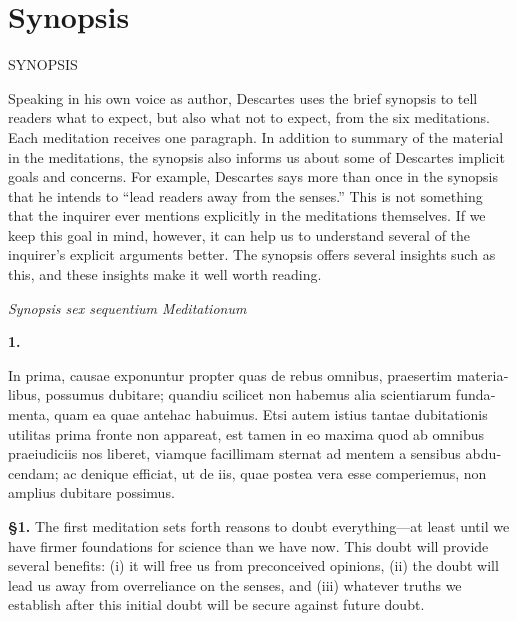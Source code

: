 \chapter{Synopsis}
%
    {\MakeUppercase{Synopsis}}


Speaking in his own voice as author, Descartes uses the brief synopsis to tell readers what to expect, but also what not to expect, from the six meditations. Each meditation receives one paragraph. In addition to summary of the material in the meditations, the synopsis also informs us about some of Descartes implicit goals and concerns. For example, Descartes says more than once in the synopsis that he intends to ``lead readers away from the senses.'' This is not something that the inquirer ever mentions explicitly in the meditations themselves. If we keep this goal in mind, however, it can help us to understand several of the inquirer's explicit arguments better. The synopsis offers several insights such as this, and these insights make it well worth reading.
\clearpage

\begin{center}
    \beginnumbering
    \numberlinefalse
    \pstart
    \textit{Synopsis sex sequentium Meditationum}
    \pend
    \endnumbering
\end{center}

\beginnumbering
\pstart
\textbf{1.} \begin{latin}In prima, causae exponuntur propter quas de rebus omnibus, praesertim materialibus, possumus dubitare; quandiu scilicet non habemus alia scientiarum fundamenta, quam ea quae antehac habuimus. Etsi autem istius tantae dubitationis utilitas prima fronte non appareat, est tamen in eo maxima quod ab omnibus praeiudiciis nos liberet, viamque facillimam sternat ad mentem a sensibus abducendam; ac denique efficiat, ut de iis, quae postea vera esse comperiemus, non amplius dubitare possimus.\end{latin}
\pend
\endnumbering

\prenotes

\textbf{§1.} The first meditation sets forth reasons to doubt everything---at least until we have firmer foundations for science than we have now. This doubt will provide several benefits: (i) it will free us from preconceived opinions, (ii) the doubt will lead us away from overreliance on the senses, and (iii) whatever truths we establish after this initial doubt will be secure against future doubt.

